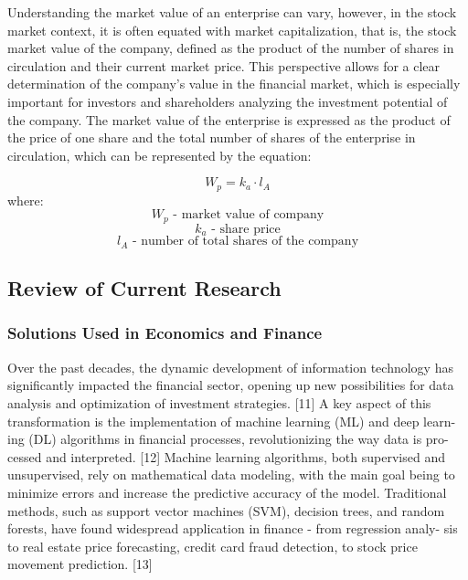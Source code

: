 \documentclass{article}
\begin{document}
\begin{flushleft}
\begin{justify}
Understanding the market value of an enterprise can vary, however, in the
stock market context, it is often equated with market capitalization, that is, the stock market value of the company, defined as the product of the number of shares in circulation and their current market price. This perspective allows
for a clear determination of the company’s value in the financial market, which
is especially important for investors and shareholders analyzing the investment
potential of the company. The market value of the enterprise is expressed as the
product of the price of one share and the total number of shares of the enterprise
in circulation, which can be represented by the equation:

\begin{equation} W_{p} = k_{a} \cdot l_{A} \end{equation}
where:
\[ W_{p} \text{ - market value of company} \]
\[ k_{a} \text{ - share price} \]
\[ l_{A} \text{ - number of total shares of the company} \]


\subsection{Review of Current Research}
\subsubsection{Solutions Used in Economics and Finance}

Over the past decades, the dynamic development of information technology has
significantly impacted the financial sector, opening up new possibilities for data
analysis and optimization of investment strategies. [11] A key aspect of this
transformation is the implementation of machine learning (ML) and deep learn-
ing (DL) algorithms in financial processes, revolutionizing the way data is pro-
cessed and interpreted. [12] Machine learning algorithms, both supervised and
unsupervised, rely on mathematical data modeling, with the main goal being to
minimize errors and increase the predictive accuracy of the model. Traditional
methods, such as support vector machines (SVM), decision trees, and random
forests, have found widespread application in finance - from regression analy-
sis to real estate price forecasting, credit card fraud detection, to stock price
movement prediction. [13]


\end{justify}
\end{flushleft}
\end{document}
